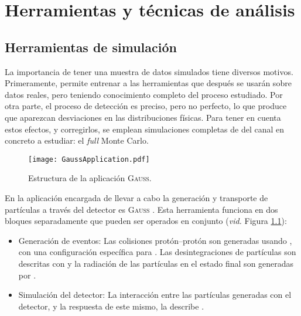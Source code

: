 \chapter{Herramientas y técnicas de análisis}
\label{cha:tools}

\section{Herramientas de simulación}

La importancia de tener una muestra de datos simulados tiene diversos motivos. Primeramente, permite entrenar a las herramientas que después se usarán sobre datos reales, pero teniendo conocimiento completo del proceso estudiado. Por otra parte, el proceso de detección es preciso, pero no perfecto, lo que produce que aparezcan desviaciones en las distribuciones físicas. Para tener en cuenta estos efectos, y corregirlos, se emplean simulaciones completas de \lhcb del canal en concreto a estudiar: el \emph{full} Monte Carlo.

\begin{figure}[H]
\centering
\texttt{[image: GaussApplication.pdf]}
\caption{Estructura de la aplicación \textsc{Gauss}.}	 \label{fig_gaussapp}
\end{figure}

En \lhcb la aplicación \color{dieg} encargada \color{norm} de llevar a cabo la generación y transporte de partículas a través del detector es \textsc{Gauss} \cite{Clemencic_2011}. Esta herramienta funciona en dos bloques separadamente que pueden ser operados en conjunto (\emph{vid.} Figura \ref{fig_gaussapp}):
\begin{itemize}
	\item Generación de eventos: Las colisiones protón--protón son generadas usando \pythia \cite{sjostrand2015introduction}, con una configuración específica para \lhcb. Las desintegraciones de partículas son descritas con \eviltgen \cite{Lange:2001uf} y la radiación de las partículas en el estado final son generadas por \photos \cite{golonka2006photos}.
	\item Simulación del detector: La interacción entre las partículas generadas con el detector, y la respuesta de este mismo, la describe \geant \cite{Agostinelli:2002hh}.
\end{itemize}


